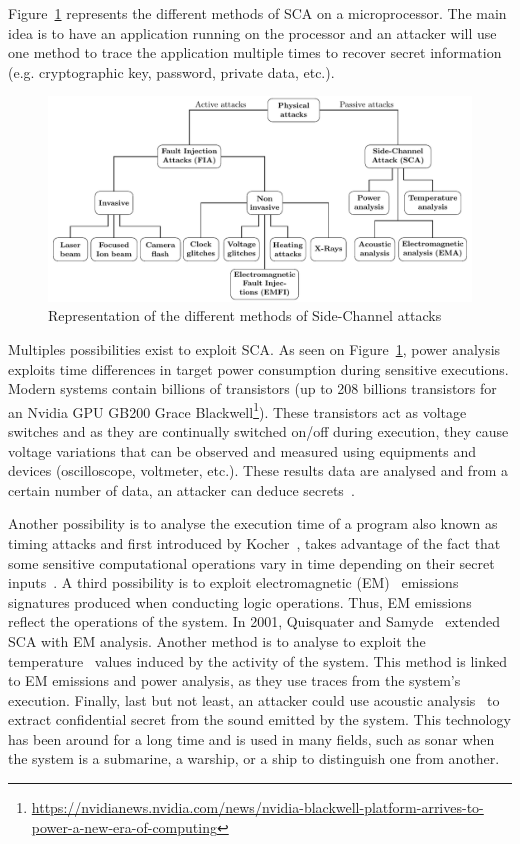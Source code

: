 Figure~\ref{fig:sca} represents the different methods of SCA on a microprocessor. The main idea is to have an application running on the processor and an attacker will use one method to trace the application multiple times to recover secret information (e.g. cryptographic key, password, private data, etc.).

\begin{figure}[ht]
    \centering
    \includegraphics[page=3, width=.75\textwidth]{c2_soa/img/physicalAttacks.pdf}
    \caption{Representation of the different methods of Side-Channel attacks}
    \label{fig:sca}
\end{figure}

Multiples possibilities exist to exploit SCA.
As seen on Figure~\ref{fig:sca}, power analysis exploits time differences in target power consumption during sensitive executions. Modern systems contain billions of transistors (up to 208 billions transistors for an Nvidia GPU GB200 Grace Blackwell\footnote{\url{https://nvidianews.nvidia.com/news/nvidia-blackwell-platform-arrives-to-power-a-new-era-of-computing}}).
These transistors act as voltage switches and as they are continually switched on/off during execution, they cause voltage variations that can be observed and measured using equipments and devices (oscilloscope, voltmeter, etc.). These results data are analysed and from a certain number of data, an attacker can deduce secrets~\cite{KJJ-98-crypto,KJJR-11-jce,GP-99-ches,LKOSECG-21-sp}.

Another possibility is to analyse the execution time of a program also known as timing attacks and first introduced by Kocher~\cite{K-96-crypto}, takes advantage of the fact that some sensitive computational operations vary in time depending on their secret inputs~\cite{DD-05-compnet}.
A third possibility is to exploit electromagnetic (EM)~\cite{ANM-19-di,HMHSS-12-tcrypo,KSTO-17-iccad, WDL-16-ntms,HGTVJ-22-dt} emissions signatures produced when conducting logic operations. Thus, EM emissions reflect the operations of the system. In 2001, Quisquater and Samyde~\cite{QS-01-scps} extended SCA with EM analysis.
Another method is to analyse to exploit the temperature~\cite{HS-14-cardis,AZRHT-21-tvlsi} values induced by the activity of the system. This method is linked to EM emissions and power analysis, as they use traces from the system's execution.
Finally, last but not least, an attacker could use acoustic analysis~\cite{BDGPS-10-usenix,GST-17-crypto,HTM-23-eurospw} to extract confidential secret from the sound emitted by the system. This technology has been around for a long time and is used in many fields, such as sonar when the system is a submarine, a warship, or a ship to distinguish one from another.


